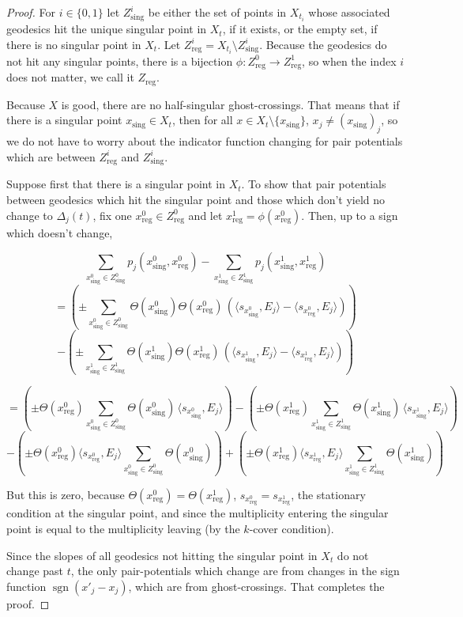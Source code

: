\documentclass[11pt,reqno,twoside]{amsart}
\newcommand{\reg}{\mathrm{reg}}
\newcommand{\sing}{\mathrm{sing}}
\DeclareMathOperator{\sign}{\mathrm{sgn}}
\theoremstyle{definition}
\begin{document}
    \begin{proof}
    For $i \in \{0,1\}$ let $Z^i_{\sing}$ be either the set of points in $X_{t_i}$ whose associated geodesics hit the unique singular point in $X_t$, if it exists, or the empty set, if there is no singular point in $X_t$. Let $Z^i_\reg = X_{t_i} \setminus Z^{i}_\sing.$ Because the geodesics do not hit any singular points, there is a bijection $\phi: Z^{0}_\reg \to Z^1_\reg$, so when the index $i$ does not matter, we call it $Z_\reg.$

    Because $X$ is good, there are no half-singular ghost-crossings. That means that if there is a singular point $x_\sing \in X_t$, then for all $x \in X_t \setminus \{x_\sing\}$, $x_j \neq (x_{\sing})_j$, so we do not have to worry about the indicator function changing for pair potentials which are between $Z^i_\reg$ and $Z^i_\sing.$ 
    
    Suppose first that there is a singular point in $X_t$.
    To show that pair potentials between geodesics which hit the singular point and those which don't 
    yield no change to $\Delta_j(t)$, 
    fix one $x^0_\reg \in Z^{0}_\reg$ and let $x^1_\reg = \phi(x^0_\reg).$ Then, up to a sign which doesn't change,

    \[\sum_{x^0_\sing \in Z^0_\sing} p_j(x^0_\sing, x^0_\reg) - \sum_{x^1_\sing \in Z^1_\sing} p_j(x^1_\sing, x^1_\reg)\]
    \[
= 
   \left( \pm \sum_{x^0_\sing \in Z^0_\sing} \Theta(x^0_\sing) \Theta(x^0_\reg) \, (\langle s_{x^0_\sing}, E_j\rangle - \langle s_{x^0_\reg}, E_j \rangle) \right) \] \[ - \left( \pm \sum_{x^1_\sing \in Z^1_\sing} \Theta(x^1_\sing) \Theta(x^1_\reg) \, (\langle s_{x^1_\sing}, E_j\rangle - \langle s_{x^1_\reg}, E_j \rangle) \right)
    \]

\[
= 
   \left( \pm \Theta(x^0_\reg) \sum_{x^0_\sing \in Z^0_\sing} \Theta(x^0_\sing)  \, \langle s_{x^0_\sing}, E_j\rangle \right)  - \left( \pm \Theta(x^1_\reg) \sum_{x^1_\sing \in Z^1_\sing} \Theta(x^1_\sing)  \, \langle s_{x^1_\sing}, E_j\rangle \right)
    \]
    \[
-  \left( \pm \Theta(x^0_\reg) \langle s_{x^0_\reg},E_j\rangle  \sum_{x^0_\sing \in Z^0_\sing} \Theta(x^0_\sing) \right)  + \left( \pm \Theta(x^1_\reg)\langle s_{x^1_\reg},E_j\rangle \sum_{x^1_\sing \in Z^1_\sing} \Theta(x^1_\sing)  \right)
    \]

    But this is zero, because $\Theta(x^0_\reg) = \Theta(x^1_\reg)$, $s_{x^0_\reg} = s_{x^1_\reg}$, 
     the stationary condition at the singular point, and since the multiplicity entering the singular point is equal to the multiplicity leaving (by the $k$-cover condition).

    Since the slopes of all geodesics not hitting the singular point in $X_t$ do not change past $t$, the only pair-potentials which change are from changes in the sign function $\sign(x'_j-x_j)$, which are from ghost-crossings. That completes the proof.
    \end{proof}
\end{document}
